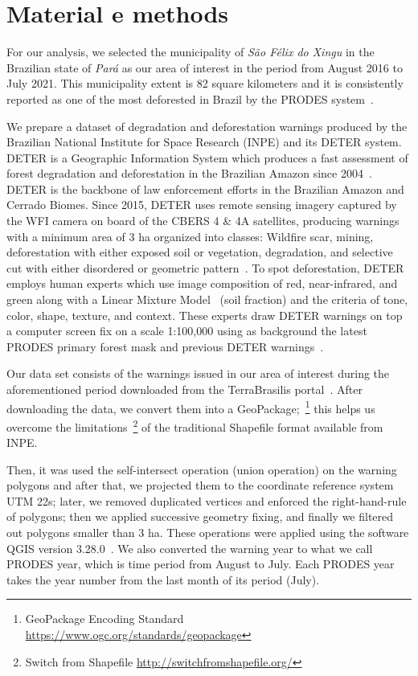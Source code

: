 \section{Material e methods}

For our analysis, we selected the municipality of \textit{São Félix do Xingu} 
in the Brazilian state of \textit{Pará} as our area of interest in the period 
from August 2016 to July 2021. 
This municipality extent is 82 square kilometers and it is consistently 
reported as one of the most deforested in 
Brazil by the PRODES system~\cite{f.g.assis2019}.

We prepare a dataset of degradation and deforestation warnings produced by the 
Brazilian National Institute for Space Research (INPE) and its DETER system.
DETER is a Geographic Information System which produces a fast assessment of 
forest degradation and deforestation in the Brazilian Amazon since 
2004~\cite{shimabukuro2006}. 
DETER is the backbone of law enforcement efforts in the Brazilian Amazon and 
Cerrado Biomes.
Since 2015, DETER uses remote sensing imagery captured by the WFI camera
on board of the CBERS 4 \& 4A satellites, producing warnings 
with a minimum area of 3 ha organized into classes: Wildfire scar, mining, 
deforestation with either exposed soil or vegetation, degradation, and 
selective cut with either disordered or geometric 
pattern~\cite{diniz2015,f.g.assis2019}. 
To spot deforestation, DETER employs human experts which use image composition 
of red, near-infrared, and green along with a Linear Mixture 
Model~\cite{shimabukuro1991} (soil fraction) and the criteria of tone, color, 
shape, texture, and context. 
These experts draw DETER warnings on top a computer screen fix on a scale 
1:100,000 using as background the latest PRODES primary forest mask and 
previous DETER warnings~\cite{dealmeida2022}.


Our data set consists of the warnings issued in our area of interest during the
aforementioned period downloaded from the TerraBrasilis 
portal~\cite{f.g.assis2019}. 
After downloading the data, we convert them into a 
GeoPackage;~\footnote{GeoPackage Encoding Standard 
\url{https://www.ogc.org/standards/geopackage}} this helps us overcome the 
limitations~\footnote{Switch from Shapefile 
\url{http://switchfromshapefile.org/}} of the traditional Shapefile format 
available from INPE. 

Then, it was used the self-intersect operation (union operation) on the warning 
polygons and after that, we projected them to the coordinate reference system 
UTM 22s; later, we removed duplicated vertices and enforced the right-hand-rule 
of polygons; then we applied successive geometry fixing, and finally we 
filtered out polygons smaller than 3 ha. 
These operations were applied using the software QGIS version 
3.28.0~\cite{QGIS_software}.
We also converted the warning year to what we call PRODES year, which is time 
period from August to July. Each PRODES year takes the year number from the 
last month of its period (July).

